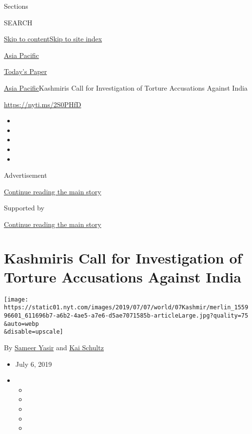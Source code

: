 Sections

SEARCH

\protect\hyperlink{site-content}{Skip to
content}\protect\hyperlink{site-index}{Skip to site index}

\href{https://www.nytimes.com/section/world/asia}{Asia Pacific}

\href{https://myaccount.nytimes.com/auth/login?response_type=cookie\&client_id=vi}{}

\href{https://www.nytimes.com/section/todayspaper}{Today's Paper}

\href{/section/world/asia}{Asia Pacific}\textbar{}Kashmiris Call for
Investigation of Torture Accusations Against India

\url{https://nyti.ms/2S0PHfD}

\begin{itemize}
\item
\item
\item
\item
\item
\end{itemize}

Advertisement

\protect\hyperlink{after-top}{Continue reading the main story}

Supported by

\protect\hyperlink{after-sponsor}{Continue reading the main story}

\hypertarget{kashmiris-call-for-investigation-of-torture-accusations-against-india}{%
\section{Kashmiris Call for Investigation of Torture Accusations Against
India}\label{kashmiris-call-for-investigation-of-torture-accusations-against-india}}

\texttt{[image: https://static01.nyt.com/images/2019/07/07/world/07Kashmir/merlin\_155996601\_611696b7-a6b2-4ae5-a7e6-d5ae7071585b-articleLarge.jpg?quality=75\\\&auto=webp\\\&disable=upscale]}

By \href{https://www.nytimes.com/by/sameer-yasir}{Sameer Yasir} and
\href{https://www.nytimes.com/by/kai-schultz}{Kai Schultz}

\begin{itemize}
\item
  July 6, 2019
\item
  \begin{itemize}
  \item
  \item
  \item
  \item
  \item
  \end{itemize}
\end{itemize}

